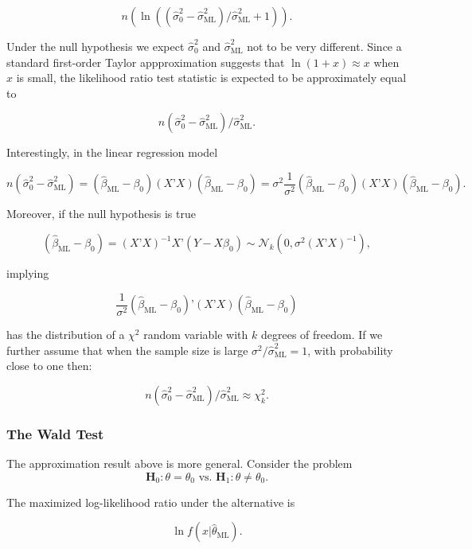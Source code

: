 \documentclass[11pt]{article} %
\begin{document}
\[n  \left( \ln \left(  (\widehat{\sigma}^2_{0} - \widehat{\sigma}^2_{\textrm{ML}})/\widehat{\sigma}^2_{\textrm{ML}} +1  \right) \right). \]

\noindent Under the null hypothesis we expect $\widehat{\sigma}^2_0$ and $\widehat{\sigma}^2_{\textrm{ML}}$ not to be very different. Since a standard first-order Taylor appproximation suggests that $\ln(1+x) \approx x$ when $x$ is small, the likelihood ratio test statistic is expected to be approximately equal to 

\[ n(\widehat{\sigma}^2_{0} - \widehat{\sigma}^2_{\textrm{ML}})/\widehat{\sigma}^2_{\textrm{ML}}.\]

\noindent Interestingly, in the linear regression model 

\[n(\widehat{\sigma}^2_{0} - \widehat{\sigma}^2_{\textrm{ML}}) = (\widehat{\beta}_{\textrm{ML}} - \beta_0 ) (X’X)  (\widehat{\beta}_{\textrm{ML}} - \beta_0 )  = \sigma^2 \frac{1}{\sigma^2} (\widehat{\beta}_{\textrm{ML}} - \beta_0 ) (X’X)  (\widehat{\beta}_{\textrm{ML}} - \beta_0 ).  \]

\noindent Moreover, if the null hypothesis is true

\[(\widehat{\beta}_{\textrm{ML}} - \beta_0 ) = (X’X)^{-1} X’(Y - X \beta_0) \sim \mathcal{N}_k(0, \sigma^2 (X’X)^{-1}),\]

\noindent implying 

\[\frac{1}{\sigma^2} (\widehat{\beta}_{\textrm{ML}} - \beta_0 )’ (X’X)  (\widehat{\beta}_{\textrm{ML}} - \beta_0 ) \]

\noindent has the distribution of a $\chi^2$ random variable with $k$ degrees of freedom. If we further assume that when the sample size is large $\sigma^2 / \widehat{\sigma}^2_{\textrm{ML}}=1$, with probability close to one then:

\[ n(\widehat{\sigma}^2_{0} - \widehat{\sigma}^2_{\textrm{ML}})/\widehat{\sigma}^2_{\textrm{ML}} \approx \chi^2_{k}.\]

\subsubsection{The Wald Test}

The approximation result above is more general. Consider the problem
\[\textbf{H}_0: \theta=\theta_0 \textrm{ vs. }  \textbf{H}_1: \theta \neq \theta_0. \]

\noindent The maximized log-likelihood ratio under the alternative is

\[ \ln f( x | \widehat{\theta}_{\textrm{ML}}).\]
\end{document}
